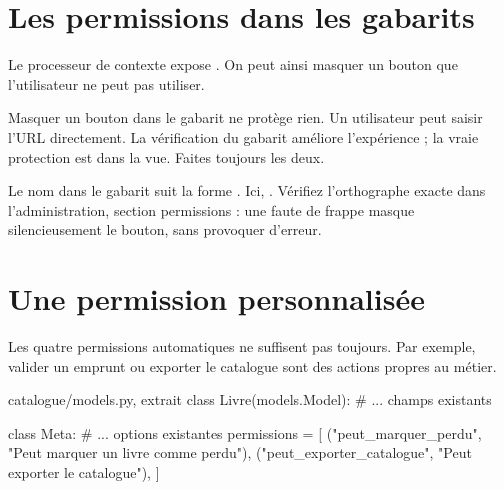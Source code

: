 \section{Les permissions dans les gabarits}

Le processeur de contexte  expose . On peut ainsi masquer un
bouton que l'utilisateur ne peut pas utiliser.


\begin{attention}
Masquer un bouton dans le gabarit ne protège rien. Un utilisateur peut saisir
l'URL directement. La vérification du gabarit améliore l'expérience ; la vraie
protection est dans la vue. Faites toujours les deux.
\end{attention}

\begin{bonne}
Le nom dans le gabarit suit la forme . Ici,
. Vérifiez l'orthographe exacte dans
l'administration, section permissions : une faute de frappe masque silencieusement
le bouton, sans provoquer d'erreur.
\end{bonne}

\section{Une permission personnalisée}

Les quatre permissions automatiques ne suffisent pas toujours. Par exemple,
\og valider un emprunt \fg{} ou \og exporter le catalogue \fg{} sont des actions
propres au métier.

\begin{codebox}[python]{catalogue/models.py, extrait}
class Livre(models.Model):
    # ... champs existants

    class Meta:
        # ... options existantes
        permissions = [
            ("peut_marquer_perdu", "Peut marquer un livre comme perdu"),
            ("peut_exporter_catalogue", "Peut exporter le catalogue"),
        ]
\end{codebox}

